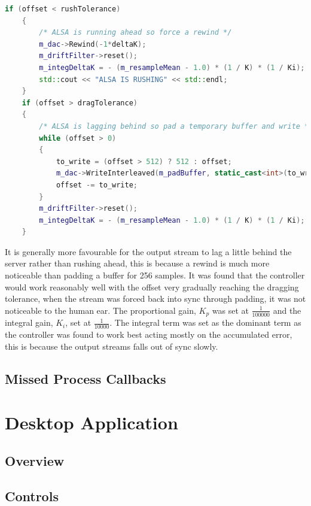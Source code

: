 \documentclass[main.tex]{subfiles}
\begin{document}
\begin{lstlisting}[language=c++, caption={Hard Rewind or Buffer Padding for Unsynchronised Streams}]
    if (offset < rushTolerance)
    {
        /* ALSA is running ahead so force a rewind */
        m_dac->Rewind(-1*deltaK);
        m_driftFilter->reset();
        m_integDeltaK = - (m_resampleMean - 1.0) * (1 / K) * (1 / Ki);
        std::cout << "ALSA IS RUSHING" << std::endl;
    }
    if (offset > dragTolerance)
    {
        /* ALSA is lagging behind so pad a temporary buffer and write */
        while (offset > 0) 
        {
	        to_write = (offset > 512) ? 512 : offset;
            m_dac->WriteInterleaved(m_padBuffer, static_cast<int>(to_write));
	        offset -= to_write;  
	    }
        m_driftFilter->reset();
        m_integDeltaK = - (m_resampleMean - 1.0) * (1 / K) * (1 / Ki);  
    }
\end{lstlisting}
It is generally more favourable for the output stream to lag a little behind the server rather than rushing ahead, this is because a rewind is much more noticeable than padding a buffer for 256 samples.
It was found that the controller would work reasonably well with the offset very gradually reaching the dragging tolerance, when the stream was forced back into sync through padding, it was not noticeable to the human ear.
The proportional gain, $K_p$ was set at $\frac{1}{100000}$ and the integral gain, $K_i$, set at $\frac{1}{10000}$.
The integral term was set as the dominant term as the controller was found to work best acting mostly on the accumulated error, this is because the output streams falls out of sync slowly.

\subsection{Missed Process Callbacks}

\begin{figure}[H]
\end{figure}

\section{Desktop Application}
\subsection{Overview}
\subsection{Controls}
\end{document}
